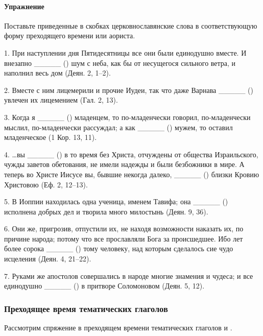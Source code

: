 \documentclass[11pt,a4paper,oneside]{memoir}
\begin{document}
                    \paragraph{Упражнение}

    Поставьте приведенные в скобках церковнославянские слова в соответствующую форму преходящего времени или аориста.
    
    1. При наступлении дня Пятидесятницы все они были единодушно вместе. И внезапно _____ ({}) шум с неба, как бы от несущегося сильного ветра, и наполнил весь дом (Деян. 2, 1--2).
    
    2. Вместе с ним лицемерили и прочие Иудеи, так что даже Варнава _____ ({}) увлечен их лицемением (Гал. 2, 13).
    
    3. Когда я _____ ({}) младенцем, то по-младенчески говорил, по-младенчески мыслил, по-младенчески рассуждал; а как _____ ({}) мужем, то оставил младенческое (1 Кор. 13, 11).
    
    4. \ldots вы _____ ({}) в то время без Христа, отчуждены от общества Израильского, чужды заветов обетования, не имели надежды и были безбожники в мире. А теперь во Христе Иисусе вы, бывшие некогда далеко, _____ ({}) близки Кровию Христовою (Еф. 2, 12--13).
    
    5. В Иоппии находилась одна ученица, именем Тавифа; она _____ ({}) исполнена добрых дел и творила много милостынь (Деян. 9, 36).
    
    6. Они же, пригрозив, отпустили их, не находя возможности наказать их, по причине народа; потому что все прославляли Бога за происшедшее. Ибо лет более сорока _____ ({}) тому человеку, над которым сделалось сие чудо исцеления (Деян. 4, 21--22).
    
    7. Руками же апостолов совершались в народе многие знамения и чудеса; и все единодушно _____ ({}) в притворе Соломоновом (Деян. 5, 12).

                \subsubsection{Преходящее время тематических глаголов}

    Рассмотрим спряжение в преходящем времени тематических глаголов {} и {}.
\end{document}
